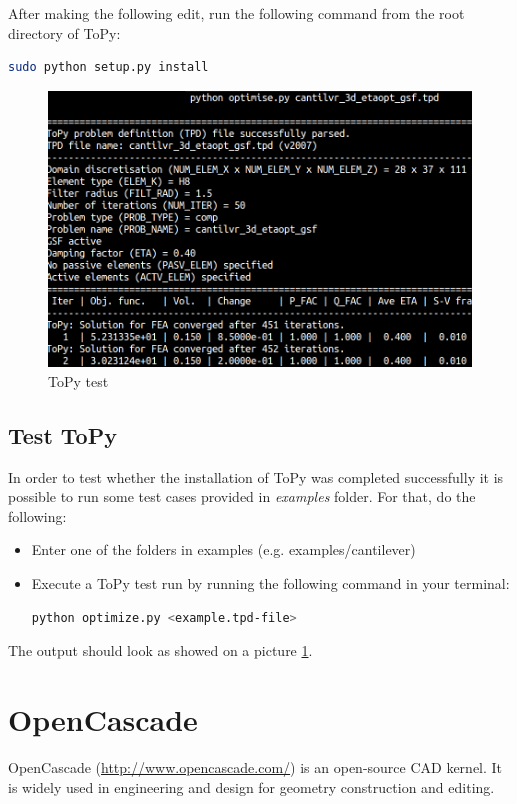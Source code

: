 \documentclass[11pt,a4paper,article,bibtotoc,idxtotoc,headsepline,footsepline,footexclude,DIV13,oneside]{scrbook}
\begin{document}
After making the following edit, run the following command from the root directory of ToPy:

\begin{lstlisting}[language=bash]
sudo python setup.py install
\end{lstlisting}	
	\begin{figure}
	\centering
	\includegraphics[scale=0.3]{img/ToPy_ExampleRun_cut.png}
	\caption{ToPy test}
	\label{fig:ToPy_test}
	\end{figure}


	\section{Test ToPy}
	In order to test whether the installation of ToPy was completed successfully it is possible to run some test cases provided in \textit{examples} folder. For that, do the following:
	\begin{itemize}
	\item Enter one of the folders in examples (e.g. examples/cantilever)
	\item Execute a ToPy test run by running the following command in your terminal:
\begin{lstlisting}[language=bash]
python optimize.py <example.tpd-file>
\end{lstlisting}	
	\end{itemize}
	
The output should look as showed on a picture \ref{fig:ToPy_test}.


\chapter{OpenCascade}
\label{OpenCascade}
OpenCascade (\href{http://www.opencascade.com/}{http://www.opencascade.com/}) is an open-source CAD kernel. It is widely used in engineering and design for geometry construction and editing.
\end{document}
